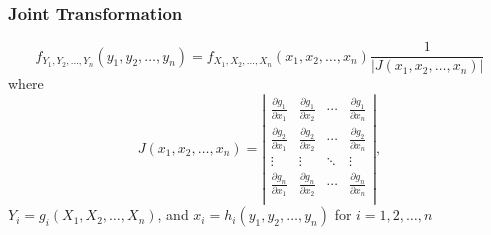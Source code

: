 \documentclass{article}
\begin{document}
\subsubsection*{Joint Transformation}
\begin{equation*}
 f_{Y_1,Y_2,\dots,Y_n}({y_1,y_2,\dots,y_n}) = f_{X_1,X_2,\dots,X_n}({x_1,x_2,\dots,x_n})\frac{1}{|J({x_1,x_2,\dots,x_n})|}
\end{equation*}
where
\begin{equation*}
 J({x_1,x_2,\dots,x_n}) = \left|\begin{array}{cccc}
 \frac{\partial g_1}{\partial x_1} & \frac{\partial g_1}{\partial x_2} & \cdots & \frac{\partial g_1}{\partial x_n}\\
 \frac{\partial g_2}{\partial x_1} & \frac{\partial g_2}{\partial x_2} & \cdots & \frac{\partial g_2}{\partial x_n}\\
 \vdots & \vdots & \ddots & \vdots\\
 \frac{\partial g_n}{\partial x_1} & \frac{\partial g_n}{\partial x_2} & \cdots & \frac{\partial g_n}{\partial x_n}\\
 \end{array}
 \right|,
\end{equation*} 
$Y_i = g_i({X_1,X_2,\dots,X_n})$, and $x_i = h_i({y_1,y_2,\dots,y_n})$ for $i = 1,2,\dots,n$
\end{document}
